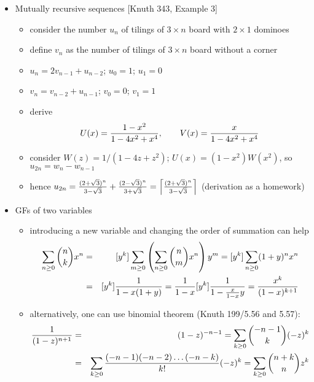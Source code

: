 \documentclass[10pt, a4paper]{article}
\begin{document}
\begin{itemize}
\item
Mutually recursive sequences [Knuth 343, Example 3]
\begin{itemize}
    \item consider the number $u_n$ of tilings of $3\times n$ board with $2\times 1$ dominoes
    \item define $v_n$ as the number of tilings of $3\times n$ board without a corner
    \item $u_n = 2v_{n-1} + u_{n-2}$; $u_0 = 1$; $u_1 = 0$
    \item $v_n = v_{n-2} + u_{n-1}$; $v_0 = 0$; $v_1 = 1$
    \item derive $$U(x) = {1-x^2\over 1-4x^2+x^4},\qquad V(x) = {x\over 1-4x^2+x^4}$$
    \item consider $W(z) = 1/(1-4z+z^2)$; $U(x) = (1-x^2)W(x^2)$, so $u_{2n} = w_n - w_{n-1}$
    \item hence $u_{2n} = {(2+\sqrt 3)^n\over 3-\sqrt 3} + {(2-\sqrt 3)^n\over 3+\sqrt 3} = \left\lceil {(2+\sqrt 3)^n\over 3-\sqrt 3}\right\rceil$
            (derivation as a homework)
\end{itemize}

\item
GFs of two variables
\begin{itemize}
    \item introducing a new variable and changing the order of summation can help
    \begin{eqnarray}
        \sum_{n\ge 0} {n\choose k}x^n &=& [y^k]\sum_{m\ge 0} \left(\sum_{n\ge 0} {n\choose m}x^n\right)y^m = [y^k]\sum_{n\ge 0} (1+y)^nx^n\nonumber\\
        &=& [y^k] {1\over 1-x(1+y)} = {1\over 1-x}[y^k] {1\over 1-{x\over 1-x}y} = {x^k\over (1-x)^{k+1}} \label{binomial}
    \end{eqnarray}
    \item alternatively, one can use binomial theorem (Knuth 199/5.56 and 5.57):
    \begin{eqnarray*}
        {1\over (1-z)^{n+1}} &=& (1-z)^{-n-1} =\sum_{k\ge 0} {-n-1\choose k}(-z)^k\\
                             &=& \sum_{k\ge 0} {(-n-1)(-n-2)\dots(-n-k)\over k!}(-z)^k = \sum_{k\ge 0} {n+k\choose n}z^k
    \end{eqnarray*}
\end{itemize}



\end{itemize}
\end{document}
